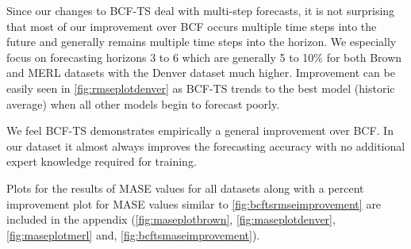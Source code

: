 Since our changes to BCF-TS deal with multi-step forecasts, it is not surprising that most of our improvement over BCF occurs multiple time steps into the future and generally remains multiple time steps into the horizon.  We especially focus on forecasting horizons 3 to 6 which are generally 5 to 10\% for both Brown and MERL datasets with the Denver dataset much higher.   Improvement can be easily seen in \ref{fig:rmseplotdenver} as BCF-TS trends to the best model (historic average) when all other models begin to forecast poorly.

We feel BCF-TS demonstrates empirically a general improvement over BCF.  In our dataset it almost always improves the forecasting accuracy with no additional expert knowledge required for training.

Plots for the results of MASE values for all datasets along with a percent improvement plot for MASE values similar to \ref{fig:bcftsrmseimprovement} are included in the appendix (\ref{fig:maseplotbrown}, \ref{fig:maseplotdenver}, \ref{fig:maseplotmerl} and, \ref{fig:bcftsmaseimprovement}).


